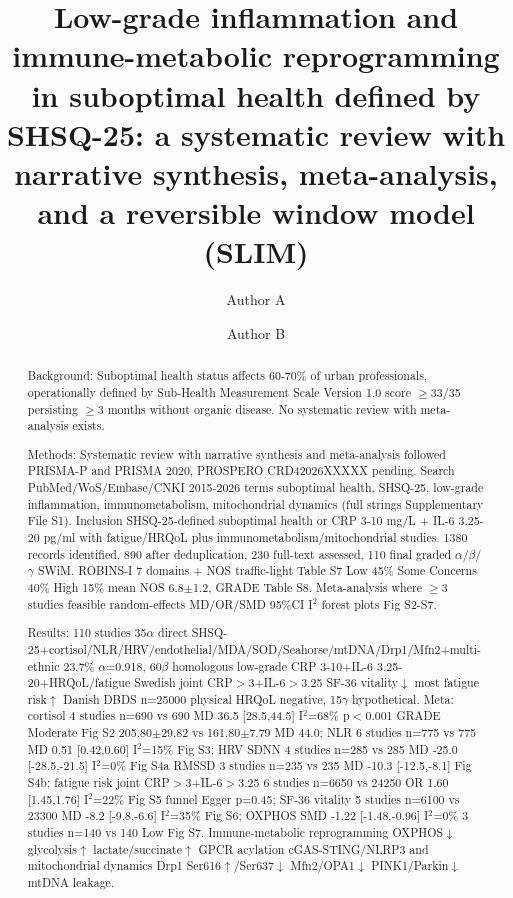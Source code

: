 \documentclass[review]{elsarticle}
\begin{document}
\begin{frontmatter}
\title{Low-grade inflammation and immune-metabolic reprogramming in suboptimal health defined by SHSQ-25: a systematic review with narrative synthesis, meta-analysis, and a reversible window model (SLIM)}
\author[aff1]{Author A}
\author[aff1]{Author B}
\address[aff1]{Affiliation, City, Country}
\begin{abstract}
Background: Suboptimal health status affects 60-70\% of urban professionals, operationally defined by Sub-Health Measurement Scale Version 1.0 score $\geq$33/35 persisting $\geq$3 months without organic disease. No systematic review with meta-analysis exists.

Methods: Systematic review with narrative synthesis and meta-analysis followed PRISMA-P and PRISMA 2020, PROSPERO CRD42026XXXXX pending. Search PubMed/WoS/Embase/CNKI 2015-2026 terms suboptimal health, SHSQ-25, low-grade inflammation, immunometabolism, mitochondrial dynamics (full strings Supplementary File S1). Inclusion SHSQ-25-defined suboptimal health or CRP 3-10 mg/L + IL-6 3.25-20 pg/ml with fatigue/HRQoL plus immunometabolism/mitochondrial studies. 1380 records identified, 890 after deduplication, 230 full-text assessed, 110 final graded $\alpha$/$\beta$/$\gamma$ SWiM. ROBINS-I 7 domains + NOS traffic-light Table S7 Low 45\% Some Concerns 40\% High 15\% mean NOS 6.8$\pm$1.2, GRADE Table S8. Meta-analysis where $\geq$3 studies feasible random-effects MD/OR/SMD 95\%CI I$^2$ forest plots Fig S2-S7.

Results: 110 studies 35$\alpha$ direct SHSQ-25+cortisol/NLR/HRV/endothelial/MDA/SOD/Seahorse/mtDNA/Drp1/Mfn2+multi-ethnic 23.7\% $\alpha$=0.918, 60$\beta$ homologous low-grade CRP 3-10+IL-6 3.25-20+HRQoL/fatigue Swedish joint CRP$>$3+IL-6$>$3.25 SF-36 vitality$\downarrow$ most fatigue risk$\uparrow$ Danish DBDS n=25000 physical HRQoL negative, 15$\gamma$ hypothetical. Meta: cortisol 4 studies n=690 vs 690 MD 36.5 [28.5,44.5] I$^2$=68\% p$<$0.001 GRADE Moderate Fig S2 205.80$\pm$29.82 vs 161.80$\pm$7.79 MD 44.0; NLR 6 studies n=775 vs 775 MD 0.51 [0.42,0.60] I$^2$=15\% Fig S3; HRV SDNN 4 studies n=285 vs 285 MD -25.0 [-28.5,-21.5] I$^2$=0\% Fig S4a RMSSD 3 studies n=235 vs 235 MD -10.3 [-12.5,-8.1] Fig S4b; fatigue risk joint CRP$>$3+IL-6$>$3.25 6 studies n=6650 vs 24250 OR 1.60 [1.45,1.76] I$^2$=22\% Fig S5 funnel Egger p=0.45; SF-36 vitality 5 studies n=6100 vs 23300 MD -8.2 [-9.8,-6.6] I$^2$=35\% Fig S6; OXPHOS SMD -1.22 [-1.48,-0.96] I$^2$=0\% 3 studies n=140 vs 140 Low Fig S7. Immune-metabolic reprogramming OXPHOS$\downarrow$ glycolysis$\uparrow$ lactate/succinate$\uparrow$ GPCR acylation cGAS-STING/NLRP3 and mitochondrial dynamics Drp1 Ser616$\uparrow$/Ser637$\downarrow$ Mfn2/OPA1$\downarrow$ PINK1/Parkin$\downarrow$ mtDNA leakage.


\end{abstract}
\end{frontmatter}
\end{document}

